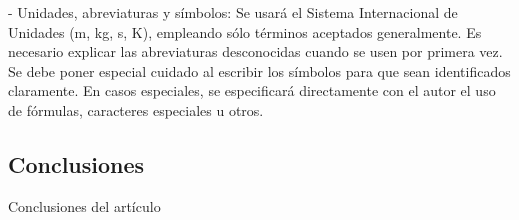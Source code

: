 \documentclass{momento}
\begin{document}
\noindent - Unidades, abreviaturas y símbolos: Se usará el Sistema Internacional de Unidades (m, kg, s, K), empleando sólo términos aceptados generalmente. Es necesario explicar las abreviaturas desconocidas cuando se usen por primera vez. Se debe poner especial cuidado al escribir los símbolos para que sean identificados claramente. En casos especiales, se especificará directamente con el autor el uso de fórmulas, caracteres especiales u otros.


\subsection*{Conclusiones}
Conclusiones del artículo



\end{document}
